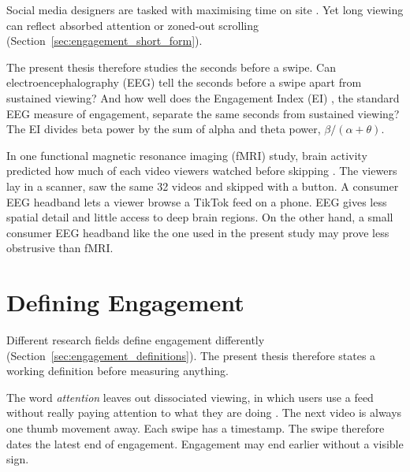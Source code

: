 \documentclass[12pt,a4paper]{report}
\begin{document}
Social media designers are tasked with maximising time on site \cite{baughan_i_2022}. Yet long viewing can reflect absorbed attention or zoned-out scrolling \cite{baughan_i_2022, knierim_flow_2026} (Section~\ref{sec:engagement_short_form}).

The present thesis therefore studies the seconds before a swipe. Can electroencephalography (EEG) tell the seconds before a swipe apart from sustained viewing? And how well does the Engagement Index (EI) \cite{pope_biocybernetic_1995-3}, the standard EEG measure of engagement, separate the same seconds from sustained viewing? The EI divides beta power by the sum of alpha and theta power, \(\beta/(\alpha+\theta)\).

In one functional magnetic resonance imaging (fMRI) study, brain activity predicted how much of each video viewers watched before skipping \cite{tong_brain_2020}. The viewers lay in a scanner, saw the same 32 videos and skipped with a button. A consumer EEG headband lets a viewer browse a TikTok feed on a phone. EEG gives less spatial detail and little access to deep brain regions. On the other hand, a small consumer EEG headband like the one used in the present study may prove less obstrusive than fMRI.

\section{Defining Engagement}
\label{sec:intro_engagement_definition}
\label{sec:working_definition}

Different research fields define engagement differently (Section~\ref{sec:engagement_definitions}). The present thesis therefore states a working definition before measuring anything.

\begin{center}
\end{center}

The word \emph{attention} leaves out dissociated viewing, in which users use a feed without really paying attention to what they are doing \cite{baughan_i_2022}. The next video is always one thumb movement away. Each swipe has a timestamp. The swipe therefore dates the latest end of engagement. Engagement may end earlier without a visible sign.
\end{document}
